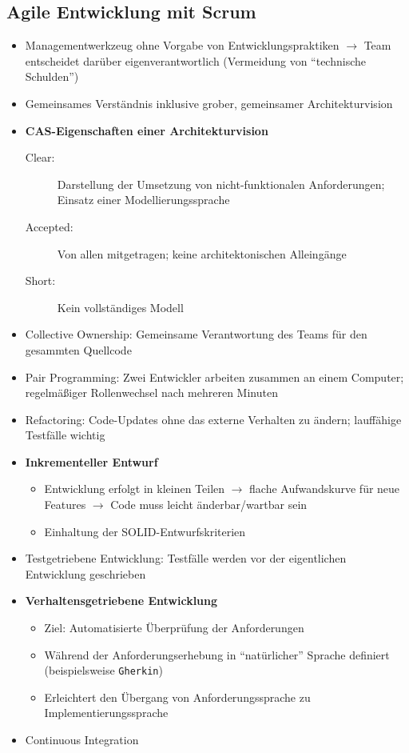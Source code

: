 \subsection{Agile Entwicklung mit Scrum}
\begin{itemize}
	\item Managementwerkzeug ohne Vorgabe von Entwicklungspraktiken \(\rightarrow\) Team entscheidet darüber eigenverantwortlich (Vermeidung von "`technische Schulden"')
	\item Gemeinsames Verständnis inklusive grober, gemeinsamer Architekturvision
	\item \textbf{CAS-Eigenschaften einer Architekturvision}
	\begin{description}
		\item[Clear:] Darstellung der Umsetzung von nicht-funktionalen Anforderungen; Einsatz einer Modellierungssprache
		\item[Accepted:] Von allen mitgetragen; keine architektonischen Alleingänge
		\item[Short:] Kein vollständiges Modell
	\end{description}
	\item Collective Ownership: Gemeinsame Verantwortung des Teams für den gesammten Quellcode
	\item Pair Programming: Zwei Entwickler arbeiten zusammen an einem Computer; regelmäßiger Rollenwechsel nach mehreren Minuten
	\item Refactoring: Code-Updates ohne das externe Verhalten zu ändern; lauffähige Testfälle wichtig
	\item \textbf{Inkrementeller Entwurf}
	\begin{itemize}
		\item Entwicklung erfolgt in kleinen Teilen \(\rightarrow\) flache Aufwandskurve für neue Features \(\rightarrow\) Code muss leicht änderbar/wartbar sein
		\item Einhaltung der SOLID-Entwurfskriterien
	\end{itemize}
	\item Testgetriebene Entwicklung: Testfälle werden vor der eigentlichen Entwicklung geschrieben
	\item \textbf{Verhaltensgetriebene Entwicklung}
	\begin{itemize}
		\item Ziel: Automatisierte Überprüfung der Anforderungen
		\item Während der Anforderungserhebung in "`natürlicher"' Sprache definiert (beispielsweise \texttt{Gherkin})
		\item Erleichtert den Übergang von Anforderungssprache zu Implementierungssprache
	\end{itemize}
	\item Continuous Integration
\end{itemize}



